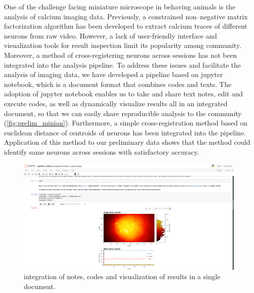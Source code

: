 \documentclass[master.tex]{subfiles}
\begin{document}
One of the challenge facing miniature microscope in behaving animals is the
analysis of calcium imaging data. Previously, a constrained non--negative matrix
factorization algorithm has been developed to extract calcium traces of
different neurons from raw video. However, a lack of user-friendly interface and
visualization tools for result inspection limit its popularity among community.
Moreover, a method of cross-registering neurons across sessions has not been
integrated into the analysis pipeline. To address these issues and facilitate
the analysis of imaging data, we have developed a pipeline based on jupyter
notebook, which is a document format that combines codes and texts. The adoption
of jupyter notebook enables us to take and share text notes, edit and execute
codes, as well as dynamically visualize results all in an integrated document,
so that we can easily share reproducible analysis to the community
(\autoref{fig:prelim_minian}). Furthermore, a simple cross-registration method
based on euclidean distance of centroids of neurons has been integrated into the
pipeline. Application of this method to our preliminary data shows that the
method could identify same neurons across sessions with satisfactory accuracy.

\begin{figure}[!h]
  \centering \includegraphics[scale = .135]{Figures/minian.png}
  \caption{\footnotesize integration of notes, codes and visualization of
    results in a single document.}
  \label{fig:prelim_minian}
\end{figure}
\end{document}
